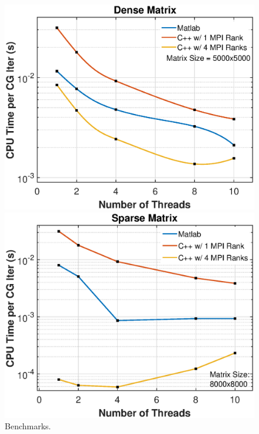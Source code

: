 \documentclass{article}
\begin{document}
\begin{figure}[H]
	\begin{minipage}[b]{0.5\linewidth}
		\centering
		\includegraphics[width=1.0\textwidth]{dense_matrix_benchmarks_log_plot_report.eps}  
	\end{minipage}
	\begin{minipage}[b]{0.5\linewidth}
		\centering
		\includegraphics[width=1.0\textwidth]{sparse_matrix_benchmarks_report.eps}  
	\end{minipage}
	\caption{Benchmarks.}
	\label{fig:benchmarks}
\end{figure}
\end{document}
